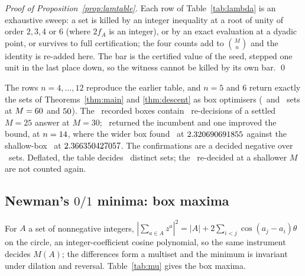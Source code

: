 \documentclass[11pt]{article}
\begin{document}
\emph{Proof of Proposition~\ref{prop:lamtable}.} Each row of Table~\ref{tab:lambda} is an exhaustive sweep: a set is killed by an integer inequality at a root of unity of order $2,3,4$ or $6$ (where $2f_A$ is an integer), or by an exact evaluation at a dyadic point, or survives to full certification; the four counts add to $\binom Mn$ and the identity is re-added here. The bar is the certified value of the seed, stepped one unit in the last place down, so the witness cannot be killed by its own bar. \qed

The rows $n=4,\dots,12$ reproduce the earlier table, and $n=5$ and $6$ return exactly the sets of Theorems~\ref{thm:main} and \ref{thm:descent} as box optimisers (\LtFiveSets\ and \LtSixSets\ sets at $M=60$ and $50$). The \LtRows\ recorded boxes contain \LtDeepened\ re-decisions of a settled $M=25$ answer at $M=30$; \LtConfirmed\ returned the incumbent and one improved the bound, at $n=14$, where the wider box found \LtImprovedSet\ at $2.320690691855$ against the shallow-box \LtImprovedPrev\ at $2.366350427057$. The confirmations are a decided negative over \LtConfirmedSets\ sets. Deflated, the table decides \LtDeepSets\ distinct sets; the \LtRedecided\ re-decided at a shallower $M$ are not counted again.

\subsection{Newman's \texorpdfstring{$0/1$}{0/1} minima: box maxima}

For $A$ a set of nonnegative integers, $|\sum_{a\in A}z^a|^2=|A|+2\sum_{i<j}\cos(a_j-a_i)\theta$ on the circle, an integer-coefficient cosine polynomial, so the same instrument decides $M(A)$; the differences form a multiset and the minimum is invariant under dilation and reversal. Table~\ref{tab:mu} gives the box maxima.

\begin{table}[t]\centering\small
{}
\caption{Proposition~\ref{prop:mu}: \texttt{certs/mu-table.json} (box 30, $n=\MuThirtyLo,\dots,\MuThirtyHi$) and \texttt{certs/mu-table-40.json} (box 40, $n=\MuFortyLo,\dots,\MuFortyHi$). Sets are $\{0\}\cup B$ with $B$ an $(n-1)$-subset of $\{1,\dots,M\}$. A box maximum is a lower bound on $\mu(n)$ and a completeness statement about its box, not a value.}\label{tab:mu}
\end{table}
\end{document}
